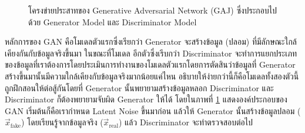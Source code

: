 \begin{figure}[H]
    \label{fig:gan}
    \begin{center}
    \caption{โครงข่ายประสาทของ Generative Adversarial Network (GAJ) ซึ่งประกอบไปด้วย Generator Model และ 
    Discriminator Model}
\end{center}
\end{figure}

หลักการของ GAN คือโมเดลตัวแรกซึ่งเรียกว่า Generator จะสร้างข้อมูล (ปลอม) ที่มีลักษณะใกล้เคียงกันกับข้อมูลจริงขึ้นมา ในขณะที่โมเดล%
อีกตัวซึ่งเรีบกว่า Discriminator จะทำการแยกประเภทของข้อมูลที่เราต้องการโดยประเมินการทำงานของโมเดลตัวแรกโดยการตัดสินว่าข้อมูลที่ 
Generator สร้างขึ้นมานั้นมีความใกล้เคียงกับข้อมูลจริงมากน้อยแค่ไหน อธิบายให้ง่ายกว่านี้ก็คือโมเดลทั้งสองตัวนี้ถูกฝึกสอนให้ต่อสู้กันโดยที่
Generator นั้นพยายามสร้างข้อมูลหลอก Discriminator และ Discriminator ก็ต้องพยายามจับผิด Generator ให้ได้ โดยในภาพที่ 
\ref{fig:gan} แสดงองค์ประกอบของ GAN เริ่มต้นก็คือเรากำหนด Latent Noise ขึ้นมาก่อน แล้วให้ Generator นั้นสร้างข้อมูลปลอม 
($\vec{x}_{\text{fake}}$) โดยเรียนรู้จากข้อมูลจริง ($\vec{x}_{\text{real}}$) แล้ว Discriminator จะทำตรวจสอบต่อไป

